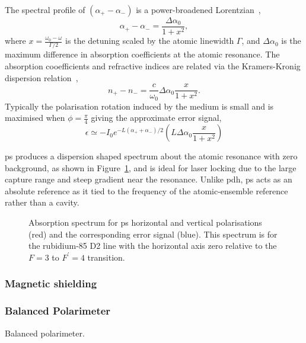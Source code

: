 The spectral profile of $(\alpha_+-\alpha_-)$ is a power-broadened Lorentzian~\cite{pearman_polarization_2002},
\begin{equation}
\alpha_+ - \alpha_- = \frac{\Delta\alpha_0}{1+x^2},
\end{equation}
where $x=\frac{\omega_0-\omega}{\Gamma/2}$ is the detuning scaled by the atomic linewidth $\Gamma$, and $\Delta\alpha_0$ is the maximum difference in absorption coefficients at the atomic resonance.
The absorption cooefficients and refractive indices are related via the Kramers-Kronig dispersion relation~\cite{demtroder_laser_2014},
\begin{equation}
n_+ - n_- = \frac{c}{\omega_0} \Delta\alpha_0 \frac{x}{1+x^2}.
\end{equation}
Typically the polarisation rotation induced by the medium is small and is maximised when $\phi=\frac{\pi}{4}$ giving the approximate error signal,
\begin{equation}
\epsilon \simeq - I_0 e^{-L(\alpha_++\alpha_-)/2}\left( L \Delta\alpha_0 \frac{x}{1+x^2}\right)
\end{equation}

\Gls{ps} produces a dispersion shaped spectrum about the atomic resonance with zero background, as shown in Figure~\ref{figure:polspecspectrum}, and is ideal for laser locking due to the large capture range and steep gradient near the resonance.
Unlike \gls{pdh}, \gls{ps} acts as an absolute reference as it tied to the frequency of the atomic-ensemble reference rather than a cavity.

\begin{figure}
\center

\caption{Absorption spectrum for \gls{ps} horizontal and vertical polarisations (red) and the corresponding error signal (blue). This spectrum is for the rubidium-85 D2 line with the horizontal axis zero relative to the $F=3$ to $F^\prime=4$ transition.}
\label{figure:polspecspectrum}
\end{figure}


\subsubsection{Magnetic shielding}

\subsubsection{Balanced Polarimeter}

Balanced polarimeter.\cite{pearman_polarization_2002,yoshikawa_frequency_2003}

